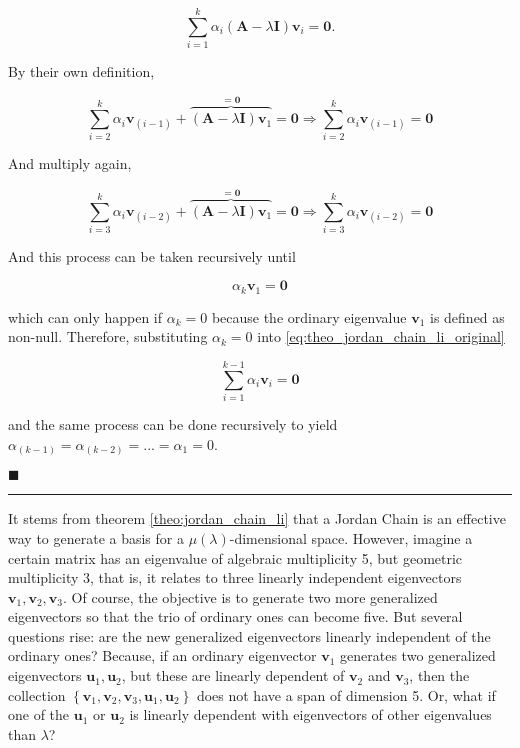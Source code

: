 \begin{equation} \sum\limits_{i=1}^{k} \alpha_i \left(\mathbf{A} - \lambda\mathbf{I}\right)\mathbf{v}_i = \mathbf{0}. \end{equation}

	By their own definition,

\begin{equation} \sum\limits_{i=2}^{k} \alpha_i \mathbf{v}_{(i-1)} + \overbrace{\left(\mathbf{A} - \lambda\mathbf{I}\right)\mathbf{v}_1}^{=\mathbf{0}} = \mathbf{0} \Rightarrow 	\sum\limits_{i=2}^{k} \alpha_i \mathbf{v}_{(i-1)} = \mathbf{0} \end{equation}

	And multiply again,

\begin{equation} \sum\limits_{i=3}^{k} \alpha_i \mathbf{v}_{(i-2)} + \overbrace{\left(\mathbf{A} - \lambda\mathbf{I}\right)\mathbf{v}_1}^{=\mathbf{0}} = \mathbf{0} \Rightarrow \sum\limits_{i=3}^{k} \alpha_i \mathbf{v}_{(i-2)} = \mathbf{0}\end{equation}

	And this process can be taken recursively until

\begin{equation} \alpha_k \mathbf{v}_{1} = \mathbf{0} \end{equation}

	which can only happen if $\alpha_k = 0$ because the ordinary eigenvalue $\mathbf{v}_1$ is defined as non-null. Therefore, substituting $\alpha_k = 0$ into \eqref{eq:theo_jordan_chain_li_original}

\begin{equation} \sum\limits_{i=1}^{k-1} \alpha_i \mathbf{v}_i = \mathbf{0} \end{equation}

	and the same process can be done recursively to yield $\alpha_{(k-1)} = \alpha_{(k-2)} = ... = \alpha_1 = 0$.

\hfill$\blacksquare$
\vspace{5mm}
\hrule
\vspace{5mm} %

	It stems from theorem \ref{theo:jordan_chain_li} that a Jordan Chain is an effective way to generate a basis for a $\mu\left(\lambda\right)$-dimensional space. However, imagine a certain matrix has an eigenvalue of algebraic multiplicity 5, but geometric multiplicity 3, that is, it relates to three linearly independent eigenvectors $\mathbf{v}_1,\mathbf{v}_2,\mathbf{v}_3$. Of course, the objective is to generate two more generalized eigenvectors so that the trio of ordinary ones can become five. But several questions rise: are the new generalized eigenvectors linearly independent of the ordinary ones? Because, if an ordinary eigenvector $\mathbf{v}_1$ generates two generalized eigenvectors $\mathbf{u}_{1},\mathbf{u}_{2}$, but these are linearly dependent of $\mathbf{v}_2$ and $\mathbf{v}_3$, then the collection $\left\{\mathbf{v}_1,\mathbf{v}_2,\mathbf{v}_3,\mathbf{u}_1,\mathbf{u}_2\right\}$ does not have a span of dimension 5. Or, what if one of the $\mathbf{u}_1$ or $\mathbf{u}_2$ is linearly dependent with eigenvectors of other eigenvalues than $\lambda$?

